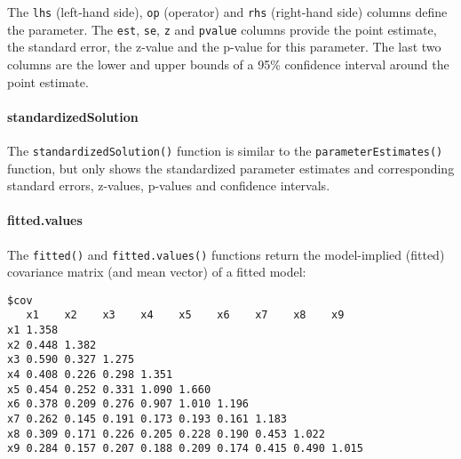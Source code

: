 The \texttt{lhs} (left-hand side), \texttt{op} (operator) and
\texttt{rhs} (right-hand side) columns define the parameter. The
\texttt{est}, \texttt{se}, \texttt{z} and \texttt{pvalue} columns
provide the point estimate, the standard error, the z-value and the
p-value for this parameter. The last two columns are the lower and upper
bounds of a 95\% confidence interval around the point estimate.

\hypertarget{standardizedsolution}{%
\paragraph{standardizedSolution}\label{standardizedsolution}}

The \texttt{standardizedSolution()} function is similar to the
\texttt{parameterEstimates()} function, but only shows the standardized
parameter estimates and corresponding standard errors, z-values,
p-values and confidence intervals.

\hypertarget{fitted.values}{%
\paragraph{fitted.values}\label{fitted.values}}

The \texttt{fitted()} and \texttt{fitted.values()} functions return the
model-implied (fitted) covariance matrix (and mean vector) of a fitted
model:

\begin{Shaded}
\begin{Highlighting}[]
\OtherTok{\textless{}{-}} 
\end{Highlighting}
\end{Shaded}

\begin{verbatim}
$cov
   x1    x2    x3    x4    x5    x6    x7    x8    x9   
x1 1.358                                                
x2 0.448 1.382                                          
x3 0.590 0.327 1.275                                    
x4 0.408 0.226 0.298 1.351                              
x5 0.454 0.252 0.331 1.090 1.660                        
x6 0.378 0.209 0.276 0.907 1.010 1.196                  
x7 0.262 0.145 0.191 0.173 0.193 0.161 1.183            
x8 0.309 0.171 0.226 0.205 0.228 0.190 0.453 1.022      
x9 0.284 0.157 0.207 0.188 0.209 0.174 0.415 0.490 1.015
\end{verbatim}

